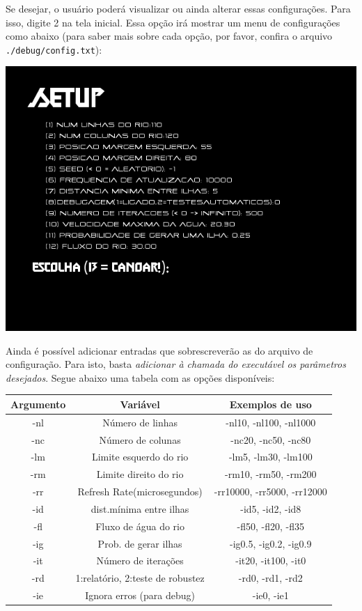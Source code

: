 \documentclass[11pt,a4paper]{article}
\begin{document}
Se desejar, o usuário poderá visualizar ou ainda alterar essas configurações. Para isso, digite 2 na tela inicial. Essa opção irá mostrar um menu de configurações como abaixo (para saber mais sobre cada opção, por favor, confira o arquivo \verb|./debug/config.txt|):\\
\begin{center}
\includegraphics[scale=0.6]{config.png}
\end{center}
\vspace{0.5cm}
Ainda é possível adicionar entradas que sobrescreverão as do arquivo de configuração. Para isto, basta \textit{adicionar à chamada do executável os parâmetros desejados}. Segue abaixo uma tabela com as opções disponíveis: \\
\begin{center}

\begin{tabular}{|c|c|c|}
\hline 
Argumento & Variável & Exemplos de uso \\ 
\hline 
-nl & Número de linhas & -nl10, -nl100, -nl1000 \\ 
\hline 
-nc & Número de colunas & -nc20, -nc50, -nc80 \\ 
\hline 
-lm & Limite esquerdo do rio & -lm5, -lm30, -lm100 \\ 
\hline 
-rm & Limite direito do rio & -rm10, -rm50, -rm200 \\ 
\hline 
-rr & Refresh Rate(microsegundos) & -rr10000, -rr5000, -rr12000 \\ 
\hline 
-id & dist.mínima entre ilhas & -id5, -id2, -id8 \\ 
\hline 
-fl & Fluxo de água do rio & -fl50, -fl20, -fl35 \\ 
\hline 
-ig & Prob. de gerar ilhas & -ig0.5, -ig0.2, -ig0.9 \\ 
\hline 
-it & Número de iterações & -it20, -it100, -it0 \\ 
\hline 
-rd & 1:relatório, 2:teste de robustez & -rd0, -rd1, -rd2 \\ 
\hline 
-ie & Ignora erros (para debug) & -ie0, -ie1 \\ 
\hline 
\end{tabular} 
\end{center}
\end{document}
